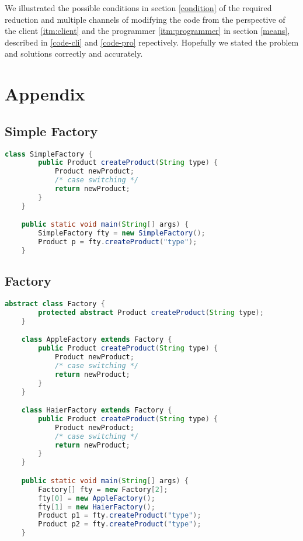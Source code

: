 \documentclass[a4paper]{article}
\begin{document}
We illustrated the possible conditions in section \ref{condition} of the required reduction
and multiple channels of modifying the code from the perspective of
the client \ref{itm:client} and the programmer \ref{itm:programmer} in section \ref{means},
described in \ref{code-cli} and \ref{code-pro} repectively.
Hopefully we stated the problem and solutions correctly and accurately.

\newpage

\section{Appendix}\label{code}

\subsection{Simple Factory}

\begin{lstlisting}[language=java]
    class SimpleFactory {
        public Product createProduct(String type) {
            Product newProduct;
            /* case switching */
            return newProduct;
        }
    }

    public static void main(String[] args) {
        SimpleFactory fty = new SimpleFactory();
        Product p = fty.createProduct("type");
    }
\end{lstlisting}

\subsection{Factory}

\begin{lstlisting}[language=java]
    abstract class Factory {
        protected abstract Product createProduct(String type);
    }

    class AppleFactory extends Factory {
        public Product createProduct(String type) {
            Product newProduct;
            /* case switching */
            return newProduct;
        }
    }

    class HaierFactory extends Factory {
        public Product createProduct(String type) {
            Product newProduct;
            /* case switching */
            return newProduct;
        }
    }

    public static void main(String[] args) {
        Factory[] fty = new Factory[2];
        fty[0] = new AppleFactory();
        fty[1] = new HaierFactory();
        Product p1 = fty.createProduct("type");
        Product p2 = fty.createProduct("type");
    }
\end{lstlisting}
\end{document}
